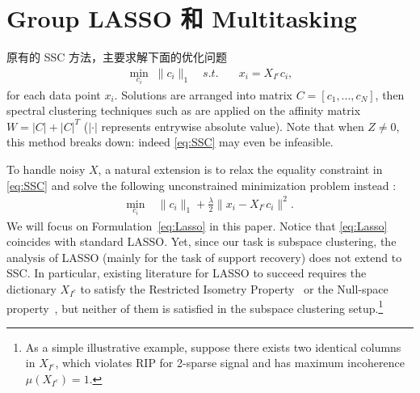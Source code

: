 \documentclass[main]{subfiles}
\begin{document}
\section{Group LASSO 和 Multitasking}
原有的 SSC 方法，主要求解下面的优化问题
\begin{equation}\label{eq:SSC}
  \begin{aligned}
    \min_{c_i} \; \|c_i\|_1 \quad s.t. \quad &x_i=X_{I^c}c_i,
  \end{aligned}
\end{equation}
for each data point $x_i$. Solutions are arranged into matrix $C=[c_1,...,c_N]$, then spectral clustering techniques such as \cite{ng2002spectral} are applied on the affinity matrix $W=|C|+|C|^T$ ($|\cdot|$ represents entrywise absolute value). Note that when $Z\neq 0$, this method breaks down: indeed \eqref{eq:SSC} may even be infeasible.

To handle noisy $X$, a natural extension is to relax the equality constraint in \eqref{eq:SSC} and solve the following unconstrained minimization problem instead \cite{elhamifar2012ssc_journal}:
\begin{equation}\label{eq:Lasso}
\begin{aligned}
\min_{c_i} \; &\|c_i\|_1+\frac{\lambda}{2}\|x_i-X_{I^c}c_i\|^2.
\end{aligned}
\end{equation}
We will focus on Formulation~\eqref{eq:Lasso} in this paper. Notice that \eqref{eq:Lasso} coincides with standard LASSO. Yet, since our task is subspace clustering, the analysis of LASSO (mainly for the task of support recovery) does not extend to SSC. In particular, existing literature for LASSO to succeed requires the dictionary $X_{I^c}$ to satisfy the Restricted Isometry Property~\cite[RIP for short;][]{candes2008RIP} or the Null-space property~\cite{donoho2006BPDN},  but neither of them is satisfied in the subspace clustering setup.\footnote{As a simple illustrative example, suppose there exists two identical columns in $X_{I^c}$, which violates RIP for 2-sparse signal and has maximum incoherence $\mu(X_{I^c})=1$.}
\end{document}

